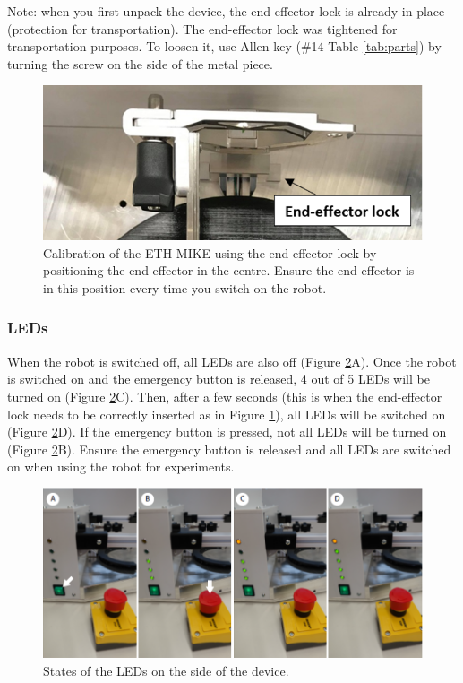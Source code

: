 \documentclass[10pt,oneside,a4paper]{article}
\begin{document}
Note: when you first unpack the device, the end-effector lock is already in place (protection for transportation). The end-effector lock was tightened for transportation purposes. To loosen it, use Allen key (\#14 Table \ref{tab:parts}) by turning the screw on the side of the metal piece. 

\begin{figure}[h!]
\begin{center}
\includegraphics[width=0.7\columnwidth]{images/Hardware/Calibration.png}
\caption{Calibration of the ETH MIKE using the end-effector lock by positioning the end-effector in the centre. Ensure the end-effector is in this position every time you switch on the robot. }
\label{fig:Calibration}
\end{center}
\end{figure}

\subsubsection*{LEDs}
When the robot is switched off, all LEDs are also off (Figure \ref{fig:LED}A). Once the robot is switched on and the emergency button is released, 4 out of 5 LEDs will be turned on (Figure \ref{fig:LED}C). Then, after a few seconds (this is when the end-effector lock needs to be correctly inserted as in Figure \ref{fig:Calibration}), all LEDs will be switched on (Figure \ref{fig:LED}D). If the emergency button is pressed, not all LEDs will be turned on (Figure \ref{fig:LED}B). Ensure the emergency button is released and all LEDs are switched on when using the robot for experiments. 

\begin{figure}[h!]
\begin{center}
\includegraphics[width=\columnwidth]{images/Hardware/LEDs.png}
\caption{States of the LEDs on the side of the device.}
\label{fig:LED}
\end{center}
\end{figure}
\end{document}
